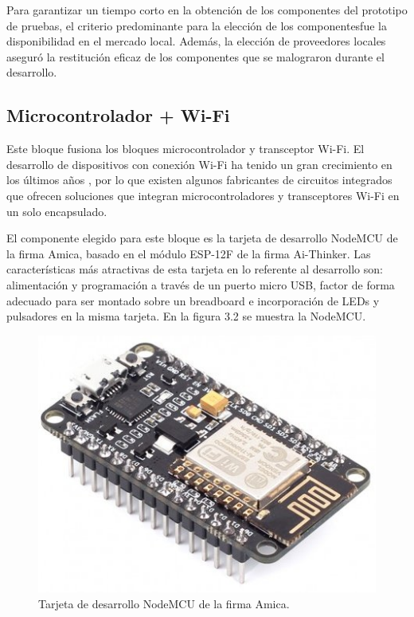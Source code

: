 Para garantizar un tiempo corto en la obtención de los componentes del prototipo de pruebas, el criterio predominante para la elección de los componentesfue la disponibilidad en el mercado local. Además, la elección de proveedores locales aseguró la restitución eficaz de los componentes que se malograron durante el desarrollo.

\subsection{Microcontrolador + Wi-Fi}

Este bloque fusiona los bloques microcontrolador y transceptor Wi-Fi. El desarrollo de dispositivos con conexión Wi-Fi ha tenido un gran crecimiento en los últimos años \citep{WEBSITE:19}, por lo que existen algunos fabricantes de circuitos integrados que ofrecen soluciones que integran microcontroladores y transceptores Wi-Fi en un solo encapsulado.

El componente elegido para este bloque es la tarjeta de desarrollo NodeMCU de la firma Amica, basado en el módulo ESP-12F de la firma Ai-Thinker. Las características más atractivas de esta tarjeta en lo referente al desarrollo son: alimentación y programación a través de un puerto micro USB, factor de forma adecuado para ser montado sobre un breadboard e incorporación de LEDs y pulsadores en la misma tarjeta. En la figura 3.2 se muestra la NodeMCU.

\begin{figure}[h]
	\centering
	\includegraphics[scale=0.5]{./Figures/nodemcu.jpg}
	\caption{Tarjeta de desarrollo NodeMCU de la firma Amica\protect\footnotemark.}
		\label{fig:nodemcu}
	\end{figure}


